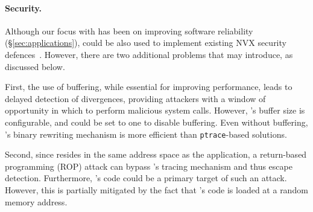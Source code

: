 \paragraph{Security.} Although our focus with \varan has been on
improving software reliability (\S\ref{sec:applications}), \varan
could be also used to implement existing NVX security
defences~\cite{cox2006,orchestra09}.  However, there are two
additional problems that \varan may introduce, as discussed below.  

First, the use of buffering, while essential for improving
performance, leads to delayed detection of divergences, providing
attackers with a window of opportunity in which to perform malicious
system calls.  However, \varan's buffer size is configurable, and
could be set to one to disable buffering. Even without buffering,
\varan's binary rewriting mechanism is more efficient than
\lstinline`ptrace`-based solutions.

Second, since \varan resides in the same address space as the
application, a return-based programming (ROP) attack can bypass
\varan's tracing mechanism and thus escape detection.  Furthermore,
\varan's code could be a primary target of such an attack. However,
this is partially mitigated by the fact that \varan's code is loaded
at a random memory address.
